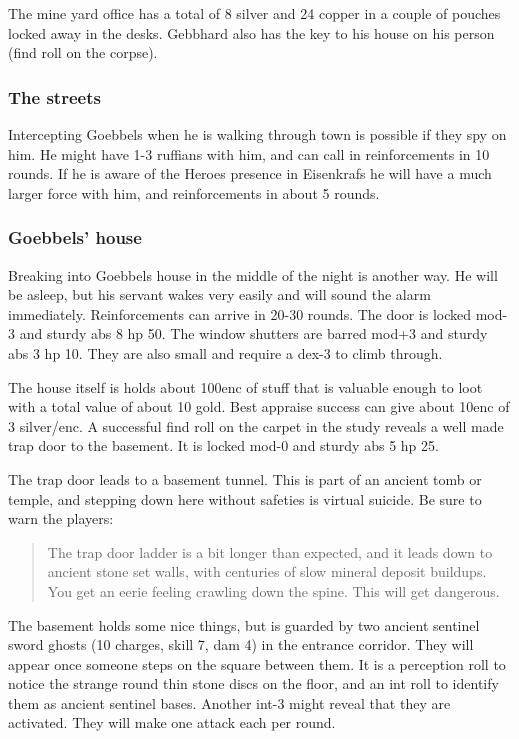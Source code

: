 \documentclass[11pt, twoside, titlepage, a4paper]{report}
\newenvironment{readoutloud}%
{\begin{quote}\begin{itshape}}%
{\end{itshape}\end{quote}}%
\begin{document}
The mine yard office has a total of 8 silver and 24 copper in a couple of pouches locked away in the desks.
Gebbhard also has the key to his house on his person (find roll on the corpse).


\subsubsection*{The streets}
Intercepting Goebbels when he is walking through town is possible if they spy on him. He might have 1-3 ruffians with him, and can call in reinforcements in 10 rounds. If he is aware of the Heroes presence in Eisenkrafs he will have a much larger force with him, and reinforcements in about 5 rounds.


\subsubsection*{Goebbels' house}
Breaking into Goebbels house in the middle of the night is another way. He will be asleep, but his servant wakes very easily and will sound the alarm immediately. Reinforcements can arrive in 20-30 rounds.
The door is locked mod-3 and sturdy abs 8 hp 50. The window shutters are barred mod+3 and sturdy abs 3 hp 10. They are also small and require a dex-3 to climb through.

The house itself is holds about 100enc of stuff that is valuable enough to loot with a total value of about 10 gold. Best appraise success can give about 10enc of 3 silver/enc.
A successful find roll on the carpet in the study reveals a well made trap door to the basement. It is locked mod-0 and sturdy abs 5 hp 25.

The trap door leads to a basement tunnel. This is part of an ancient tomb or temple, and stepping down here without safeties is virtual suicide. Be sure to warn the players:
\begin{readoutloud}
The trap door ladder is a bit longer than expected, and it leads down to ancient stone set walls, with centuries of slow mineral deposit buildups. You get an eerie feeling crawling down the spine. This will get dangerous.
\end{readoutloud}

The basement holds some nice things, but is guarded by two ancient sentinel sword ghosts (10 charges, skill 7, dam 4) in the entrance corridor. They will appear once someone steps on the square between them.
It is a perception roll to notice the strange round thin stone discs on the floor, and an int roll to identify them as ancient sentinel bases. Another int-3 might reveal that they are activated. They will make one attack each per round.
\end{document}

